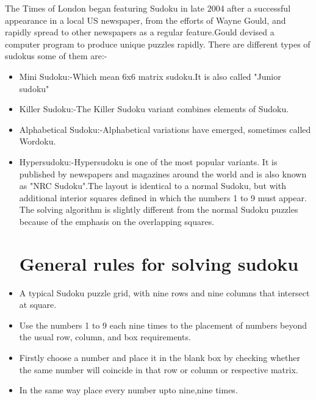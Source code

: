 \documentclass[12pt]{article}
\begin{document}
      The Times of London began featuring Sudoku in late 2004 after a successful appearance in a local US newspaper, from the efforts of Wayne Gould, and rapidly spread to other newspapers as a regular feature.Gould devised a computer program to produce unique puzzles rapidly.
      There are different types of sudokus some of them are:- 
       \begin{itemize}
      \item Mini Sudoku:-Which mean 6x6 matrix sudoku.It is also called "Junior sudoku"
      \item Killer Sudoku:-The Killer Sudoku variant combines elements of Sudoku.
      \item Alphabetical Sudoku:-Alphabetical variations have emerged, sometimes called Wordoku.
      \item Hypersudoku:-Hypersudoku is one of the most popular variants. It is published by newspapers and magazines around the world and is also known as "NRC Sudoku".The layout is identical to a normal Sudoku, but with additional interior squares defined in which the numbers 1 to 9 must appear. The solving algorithm is slightly different from the normal Sudoku puzzles because of the emphasis on the overlapping squares.
\section{General rules for solving sudoku}
  \item A typical Sudoku puzzle grid, with nine rows and nine columns that intersect at square.
\item Use the numbers 1 to 9 each nine times to the placement of numbers beyond the usual row, column, and box requirements.
\item Firstly choose a number and place it in the blank box by checking whether the same number will coincide in that row or column or respective matrix.
\item In the same way place every number upto nine,nine times.



\end{itemize}
\end{document}

